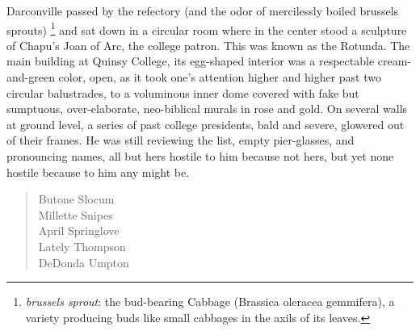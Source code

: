   Darconville passed by the refectory 
(and the odor of mercilessly boiled brussels sprouts)
\footnote{ \textit{brussels sprout}: the bud-bearing Cabbage (Brassica oleracea 
gemmifera), a variety producing buds like small cabbages in the axils of its 
leaves. 
}
and sat down in a circular room where in the center stood a
sculpture of Chapu's Joan of Arc, the college patron. This was known as the
Rotunda. The main building at Quinsy College, its egg-shaped interior was a
respectable cream-and-green color, open, as it took one's attention higher and
higher past two circular balustrades, 
to a voluminous inner dome covered with fake but sumptuous, 
over-elaborate, neo-biblical murals in rose and gold. On
several walls at ground level, a series of past college presidents, bald and
severe, glowered 
out of their frames. He was still reviewing the list, empty
pier-glasses, and pronouncing names, all but hers hostile to him because not
hers, but yet none hostile because to him any might be.
 
\begin{verse}
        \hspace{6em} Butone Slocum   \\
        \hspace{6em} Millette Snipes  \\
        \hspace{6em} April Springlove \\
        \hspace{6em} Lately Thompson  \\
        \hspace{6em} DeDonda Umpton
\end{verse}
 
